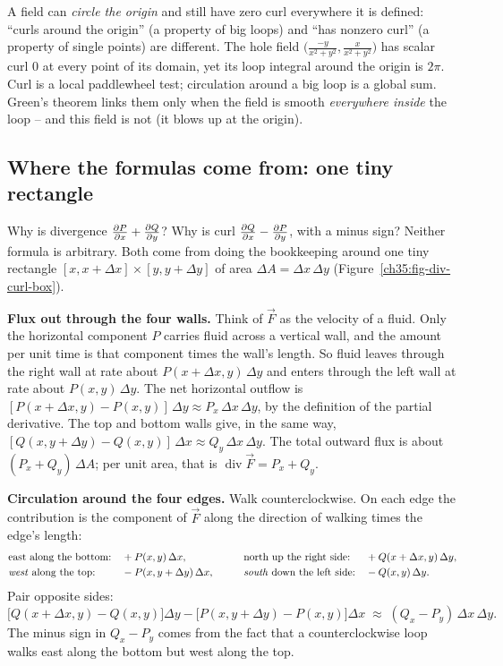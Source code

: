 \begin{trapbox}
A field can \emph{circle the origin} and still have zero curl everywhere it is
defined: ``curls around the origin'' (a property of big loops) and ``has nonzero
curl'' (a property of single points) are different. The
hole field $\big(\frac{-y}{x^2+y^2},\frac{x}{x^2+y^2}\big)$ has scalar curl $0$ at
every point of its domain, yet its loop integral around the origin is $2\pi$.
Curl is a local paddlewheel test; circulation around a big loop is a global sum.
Green's theorem links them only when the field is smooth \emph{everywhere inside}
the loop -- and this field is not (it blows up at the origin).
\end{trapbox}

\subsection{Where the formulas come from: one tiny rectangle}

Why is divergence $\frac{\partial P}{\partial x} + \frac{\partial Q}{\partial y}$? Why is curl $\frac{\partial Q}{\partial x} - \frac{\partial P}{\partial y}$,
with a minus sign? Neither formula is arbitrary. Both come from doing the
bookkeeping around one tiny rectangle $[x, x+\Delta x] \times [y, y+\Delta y]$ of
area $\Delta A=\Delta x\,\Delta y$ (Figure~\ref{ch35:fig-div-curl-box}).

\textbf{Flux out through the four walls.} Think of $\vec F$ as the velocity of a
fluid. Only the horizontal component $P$ carries fluid across a vertical wall, and
the amount per unit time is that component times the wall's length. So fluid leaves
through the right wall at rate about $P(x+\Delta x,y)\,\Delta y$ and enters through
the left wall at rate about $P(x,y)\,\Delta y$. The net horizontal outflow is
$[P(x+\Delta x,y)-P(x,y)]\,\Delta y\approx P_x\,\Delta x\,\Delta y$, by the
definition of the partial derivative. The top and bottom walls give, in the same
way, $[Q(x,y+\Delta y)-Q(x,y)]\,\Delta x\approx Q_y\,\Delta x\,\Delta y$. The total
outward flux is about $(P_x+Q_y)\,\Delta A$; per unit area, that is
$\operatorname{div}\vec F=P_x+Q_y$.

\textbf{Circulation around the four edges.} Walk counterclockwise. On each edge the
contribution is the component of $\vec F$ along the direction of walking times the
edge's length:
\[
\begin{aligned}
  &\text{east along the bottom:} && +P(x,y)\,\Delta x, &\qquad
  &\text{north up the right side:} && +Q(x+\Delta x,y)\,\Delta y,\\
  &\text{\emph{west} along the top:} && -P(x,y+\Delta y)\,\Delta x, &\qquad
  &\text{\emph{south} down the left side:} && -Q(x,y)\,\Delta y.
\end{aligned}
\]
Pair opposite sides:
\[
  \big[Q(x+\Delta x,y)-Q(x,y)\big]\Delta y-\big[P(x,y+\Delta y)-P(x,y)\big]\Delta x
  \;\approx\;(Q_x-P_y)\,\Delta x\,\Delta y .
\]
The minus sign in $Q_x-P_y$ comes from the fact that a counterclockwise loop walks
east along the bottom but west along the top.

